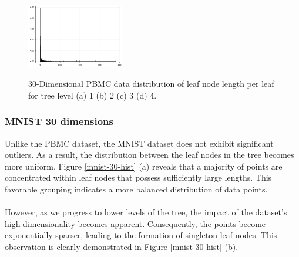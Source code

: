 \documentclass{juliacon}
\begin{document}
\begin{figure}[!ht]
{    \includegraphics[width=10pc]{figures/experiments/pbmc_30/hist_4.png}
  }

  \caption{
    30-Dimensional PBMC data distribution of leaf node length per leaf for tree
    level (a) 1 (b) 2 (c) 3 (d) 4.
  }
  \label{pbmc-30-hist}
\end{figure}


\subsubsection{MNIST 30 dimensions}

Unlike the PBMC dataset, the MNIST dataset does not exhibit significant
outliers. As a result, the distribution between the leaf nodes in the tree
becomes more uniform. Figure \ref{mnist-30-hist} (a) reveals that a majority of
points are concentrated within leaf nodes that possess sufficiently large
lengths. This favorable grouping indicates a more balanced distribution of data
points.
\\\\
However, as we progress to lower levels of the tree, the impact of the
dataset's high dimensionality becomes apparent. Consequently, the points become
exponentially sparser, leading to the formation of singleton leaf nodes.
This observation is clearly demonstrated in Figure \ref{mnist-30-hist} (b).
\end{document}
